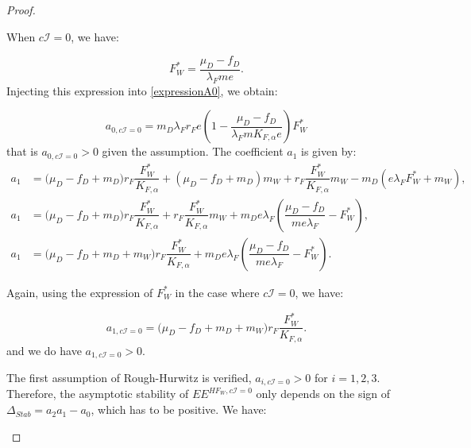 \documentclass{article}
\newcommand{\lfw}{\lambda_{F}}
\newcommand{\lfw}{\lambda_{F}}
\newcommand{\Kfa}{K_{F,\alpha}}
\newcommand{\cI}{c \mathcal{I}}
\begin{document}
\begin{proof}
\begin{itemize}
When $\cI = 0$, we have:

\begin{equation*}
F_W^* = \dfrac{\mu_D - f_D}{\lfw m e}.
\end{equation*} 
Injecting this expression into \eqref{expressionA0}, we obtain:

\begin{equation*}
a_{0, \cI=0} = m_D \lfw r_F e\left(1 - \dfrac{\mu_D - f_D}{\lfw m \Kfa e } \right) F_W^*
\end{equation*}
that is $a_{0, \cI=0}>0$ given the assumption. The coefficient $a_1$ is given by:
\begin{subequations}
\begin{align}
a_1 &= \big( \mu_D  -f_D + m_D) r_F \dfrac{F^*_W}{K_{F, \alpha}} + (\mu_D -f_D + m_D) m_W + r_F \dfrac{F_W^*}{K_{F, \alpha}} m_W - m_D (e\lfw F^*_W + m_W), \\
a_1 &= \big( \mu_D -f_D + m_D) r_F \dfrac{F^*_W}{K_{F, \alpha}}  + r_F \dfrac{F_W^*}{K_{F, \alpha}} m_W + m_D e\lfw   \left(\dfrac{\mu_D - f_D}{m e\lfw} - F^*_W \right),  \\
a_1 &= \big( \mu_D -f_D + m_D + m_W) r_F \dfrac{F^*_W}{K_{F, \alpha}}   + m_D e\lfw   \left(\dfrac{\mu_D - f_D}{m e\lfw} - F^*_W \right). \label{expressionA1}
\end{align}
\end{subequations}

Again, using the expression of $F^*_W$ in the case where $\cI = 0$, we have:

\begin{equation*}
a_{1, \cI =0} = \big( \mu_D -f_D + m_D + m_W) r_F \dfrac{F^*_W}{K_{F, \alpha}}.
\end{equation*}
and we do have $a_{1, \cI =0} > 0$.

The first assumption of Rough-Hurwitz is verified, $a_{i, \cI =0} > 0$ for $i=1,2,3$. Therefore, the asymptotic stability of $EE^{HF_W,  \cI =0}$ only depends on the sign of $\Delta_{Stab}= a_2 a_1 - a_0$, which has to be positive. We have:


\end{itemize}
\end{proof}
\end{document}
